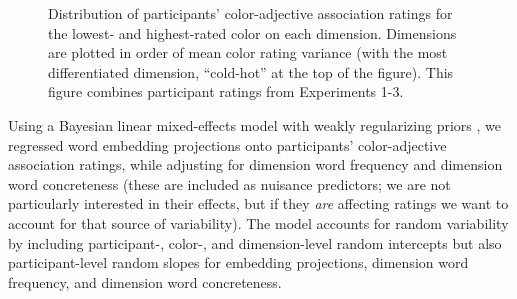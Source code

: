 \documentclass[10pt,letterpaper]{article}
\begin{document}
\begin{figure}[ht!]
\begin{center}
\caption{Distribution of participants' color-adjective association ratings for the lowest- and highest-rated color on each dimension. Dimensions are plotted in order of mean color rating variance (with the most differentiated dimension, ``cold-hot'' at the top of the figure). This figure combines participant ratings from Experiments 1-3.}
\label{color_ratings}
\end{center}
\end{figure}

Using a Bayesian linear mixed-effects model with weakly regularizing priors \cite{yarkoni2016bambi}, we regressed word embedding projections onto participants' color-adjective association ratings, while adjusting for dimension word frequency and dimension word concreteness (these are included as nuisance predictors; we are not particularly interested in their effects, but if they \emph{are} affecting ratings we want to account for that source of variability). The model accounts for random variability by including participant-, color-, and dimension-level random intercepts but also participant-level random slopes for embedding projections, dimension word frequency, and dimension word concreteness.
\end{document}
